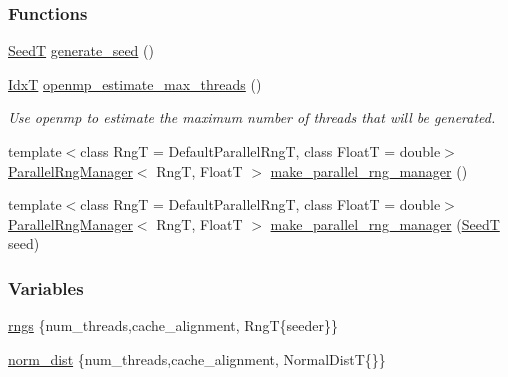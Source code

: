 \subsubsection*{Functions}
\begin{DoxyCompactItemize}
\item 
\hyperlink{namespaceparallel__rng_a462b8721a1aabe3b86582e864640c707}{Seed\-T} \hyperlink{namespaceparallel__rng_ae9d03797791785f0b9512fc2ef69bfb7}{generate\-\_\-seed} ()
\item 
\hyperlink{namespaceparallel__rng_aa22fa3e339aee5927780aac099dfc6f3}{Idx\-T} \hyperlink{namespaceparallel__rng_a6165820e910d529d0287c1b1314be94e}{openmp\-\_\-estimate\-\_\-max\-\_\-threads} ()
\begin{DoxyCompactList}\small\item\em Use openmp to estimate the maximum number of threads that will be generated. \end{DoxyCompactList}\item 
{\footnotesize template$<$class Rng\-T  = Default\-Parallel\-Rng\-T, class Float\-T  = double$>$ }\\\hyperlink{classparallel__rng_1_1ParallelRngManager}{Parallel\-Rng\-Manager}$<$ Rng\-T, Float\-T $>$ \hyperlink{namespaceparallel__rng_a1442f14113d25568626a66f85c40e4ee}{make\-\_\-parallel\-\_\-rng\-\_\-manager} ()
\item 
{\footnotesize template$<$class Rng\-T  = Default\-Parallel\-Rng\-T, class Float\-T  = double$>$ }\\\hyperlink{classparallel__rng_1_1ParallelRngManager}{Parallel\-Rng\-Manager}$<$ Rng\-T, Float\-T $>$ \hyperlink{namespaceparallel__rng_a3d16c2aa5295d7ebeacbb87cb38c8e85}{make\-\_\-parallel\-\_\-rng\-\_\-manager} (\hyperlink{namespaceparallel__rng_a462b8721a1aabe3b86582e864640c707}{Seed\-T} seed)
\end{DoxyCompactItemize}
\subsubsection*{Variables}
\begin{DoxyCompactItemize}
\item 
\hyperlink{namespaceparallel__rng_af6082f576781284b1b4566ec1a287bcd}{rngs} \{num\-\_\-threads,cache\-\_\-alignment, Rng\-T\{seeder\}\}
\item 
\hyperlink{namespaceparallel__rng_a049383bd0d1effa65defa02ed2a9ac1b}{norm\-\_\-dist} \{num\-\_\-threads,cache\-\_\-alignment, Normal\-Dist\-T\{\}\}
\end{DoxyCompactItemize}



